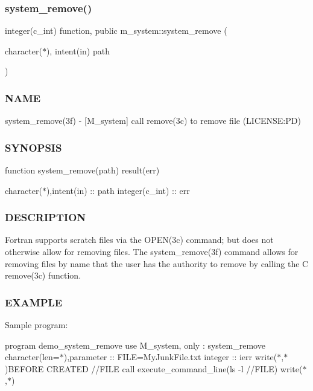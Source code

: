 \subsubsection{\texorpdfstring{system\+\_\+remove()}{system\_remove()}}
{\footnotesize\ttfamily integer(c\+\_\+int) function, public m\+\_\+system\+::system\+\_\+remove (\begin{DoxyParamCaption}\item[{character($\ast$), intent(in)}]{path }\end{DoxyParamCaption})}



\subsubsection*{N\+A\+ME}

system\+\_\+remove(3f) -\/ \mbox{[}M\+\_\+system\mbox{]} call remove(3c) to remove file (L\+I\+C\+E\+N\+SE\+:PD) \subsubsection*{S\+Y\+N\+O\+P\+S\+IS}

function system\+\_\+remove(path) result(err)

character($\ast$),intent(in) \+:\+: path integer(c\+\_\+int) \+:\+: err

\subsubsection*{D\+E\+S\+C\+R\+I\+P\+T\+I\+ON}

Fortran supports scratch files via the O\+P\+E\+N(3c) command; but does not otherwise allow for removing files. The system\+\_\+remove(3f) command allows for removing files by name that the user has the authority to remove by calling the C remove(3c) function.

\subsubsection*{E\+X\+A\+M\+P\+LE}

Sample program\+:

program demo\+\_\+system\+\_\+remove use M\+\_\+system, only \+: system\+\_\+remove character(len=$\ast$),parameter \+:\+: F\+I\+LE=\textquotesingle{}My\+Junk\+File.\+txt\textquotesingle{} integer \+:\+: ierr write($\ast$,$\ast$)\textquotesingle{}B\+E\+F\+O\+RE C\+R\+E\+A\+T\+ED \textquotesingle{}//\+F\+I\+LE call execute\+\_\+command\+\_\+line(\textquotesingle{}ls -\/l \textquotesingle{}//\+F\+I\+LE) write($\ast$,$\ast$)

